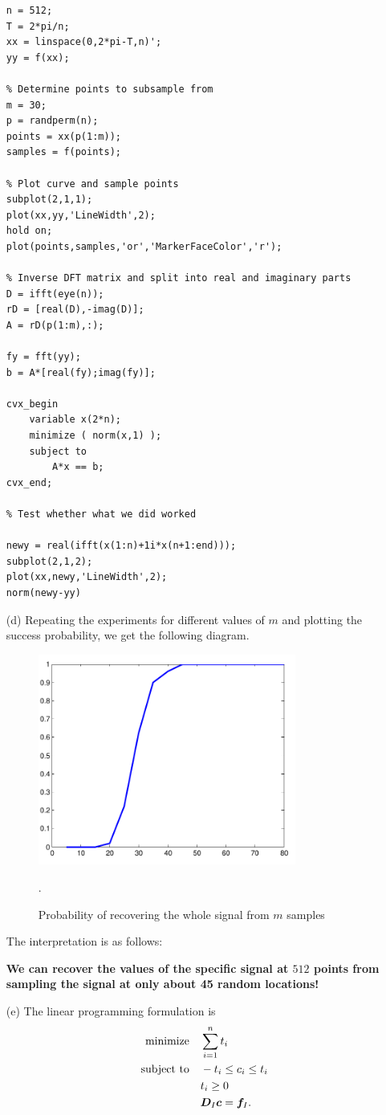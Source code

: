 \documentclass{article}
\begin{document}
\begin{itemize}
{\begin{lstlisting}[frame=single]
% Set up vector f
n = 512;
T = 2*pi/n;
xx = linspace(0,2*pi-T,n)';
yy = f(xx);

% Determine points to subsample from
m = 30;
p = randperm(n);
points = xx(p(1:m));
samples = f(points);

% Plot curve and sample points
subplot(2,1,1);
plot(xx,yy,'LineWidth',2);
hold on;
plot(points,samples,'or','MarkerFaceColor','r');

% Inverse DFT matrix and split into real and imaginary parts
D = ifft(eye(n));
rD = [real(D),-imag(D)];
A = rD(p(1:m),:);

fy = fft(yy);
b = A*[real(fy);imag(fy)];

cvx_begin
    variable x(2*n);
    minimize ( norm(x,1) );
    subject to
        A*x == b;
cvx_end;

% Test whether what we did worked

newy = real(ifft(x(1:n)+1i*x(n+1:end)));
subplot(2,1,2);
plot(xx,newy,'LineWidth',2);
norm(newy-yy)
\end{lstlisting}}
\item[(d)] Repeating the experiments for different values of $m$ and plotting the success probability, we get the following diagram.
\begin{figure}[h!]
 \centering
 \includegraphics[width=0.8\textwidth]{images/thresh_cropped.pdf}
\caption{Probability of recovering the whole signal from $m$ samples}.
 \end{figure}
The interpretation is as follows: 

{\bf We can  recover the values of the specific signal at $512$ points from sampling the signal at only about 45 random locations!}
\item[(e)] The linear programming formulation is
\begin{align*}
 \text{minimize}\quad & \sum_{i=1}^n t_i\\
 \quad\text{subject to}\quad & -t_i\leq c_i\leq t_i\\
 & t_i\geq 0\\
 & \bm{D}_I\bm{c}=\bm{f}_I.
\end{align*}

\end{itemize}
\end{document}

